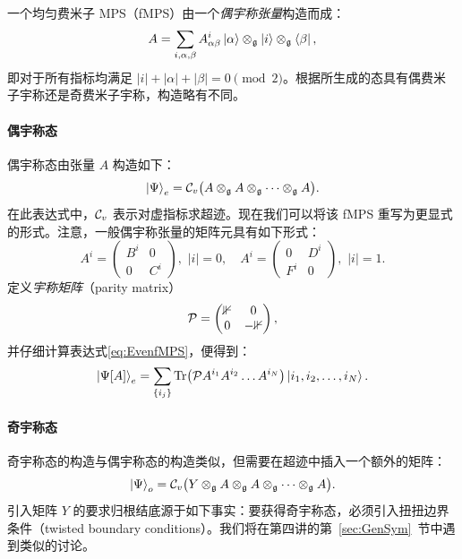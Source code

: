 一个均匀费米子 MPS（fMPS）由一个\emph{偶宇称张量}构造而成：
\begin{equation}
    A = \sum_{i,\alpha,\beta}A_{\alpha\beta}^i \ket{\alpha} \otimes_\mathfrak{g} \ket{i} \otimes_\mathfrak{g} \bra{\beta},
\end{equation}
即对于所有指标均满足 $\lvert i \rvert + \lvert \alpha \rvert + \lvert \beta \rvert = 0 \pmod 2$。根据所生成的态具有偶费米子宇称还是奇费米子宇称，构造略有不同。
\paragraph{偶宇称态}
偶宇称态由张量 $A$ 构造如下：
\begin{equation}\label{eq:EvenfMPS}
    \ket{\Psi}_e = \mathcal C_v\big(A\otimes_\mathfrak g A \otimes_\mathfrak g\dots \otimes_\mathfrak g A\big).
\end{equation}
在此表达式中，$\mathcal C_v$ 表示对虚指标求超迹。现在我们可以将该 fMPS 重写为更显式的形式。注意，一般偶宇称张量的矩阵元具有如下形式：
\begin{equation}
    A^i =
    \begin{pmatrix}
        B^i & 0 \\
        0 & C^i
    \end{pmatrix}, \,\, \lvert i \rvert = 0, \quad
    A^i =
    \begin{pmatrix}
        0 & D^i \\
        F^i & 0
    \end{pmatrix}, \,\, \lvert i \rvert = 1.
\end{equation}
定义\emph{宇称矩阵}（parity matrix）
\begin{equation}
    \mathcal P = \begin{pmatrix}\mathbb 1 & 0\\ 0 & -\mathbb 1\end{pmatrix},
\end{equation}
并仔细计算表达式\cref{eq:EvenfMPS}，便得到：
\begin{equation}
    \ket{\Psi[A]}_e = \sum_{\{i_j\}} {\rm Tr}\big(\mathcal PA^{i_1}A^{i_2}\dots A^{i_N}\big) \ket{i_1,i_2,\dots,i_N}.
\end{equation}
\paragraph{奇宇称态}
奇宇称态的构造与偶宇称态的构造类似，但需要在超迹中插入一个额外的矩阵：
\begin{equation}
    \ket{\Psi}_o = \mathcal C_v\big(Y\otimes_\mathfrak gA\otimes_\mathfrak g A \otimes_\mathfrak g\dots \otimes_\mathfrak g A\big).
\end{equation}
引入矩阵 $Y$ 的要求归根结底源于如下事实：要获得奇宇称态，必须引入扭扭边界条件（twisted boundary conditions）。我们将在第四讲的第~\ref{sec:GenSym}~节中遇到类似的讨论。


